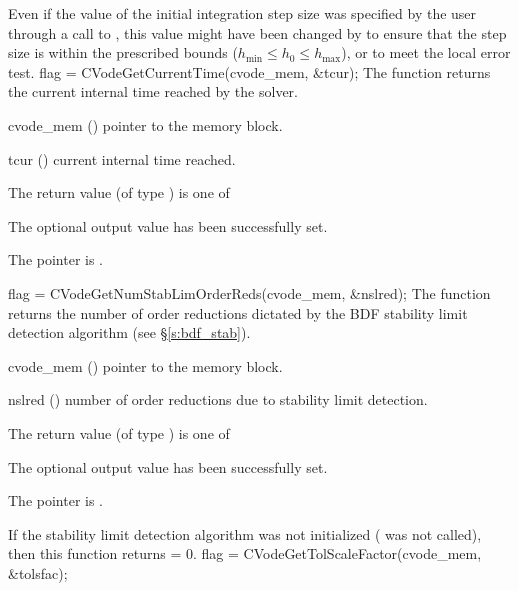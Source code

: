 {
  Even if the value of the initial integration step size was specified
  by the user through a call to , this value might have 
  been changed by {\cvode} to ensure that the step size is within the 
  prescribed bounds ($h_{\min} \le h_0 \le h_{\max}$), or to meet the
  local error test.
}
{
  flag = CVodeGetCurrentTime(cvode\_mem, \&tcur);
}
{
  The function  returns the
  current internal time reached by the solver.
}
{
  \begin{args}
  \item[cvode\_mem] ()
    pointer to the {\cvode} memory block.
  \item[tcur] ()
    current internal time reached.
  \end{args}
}
{
  The return value  (of type ) is one of
  \begin{args}
  \item[\Id{CV\_SUCCESS}] 
    The optional output value has been successfully set.
  \item[\Id{CV\_MEM\_NULL}]
    The  pointer is .
  \end{args}
}
{}
{
  flag = CVodeGetNumStabLimOrderReds(cvode\_mem, \&nslred);
}
{
  The function  returns the
  number of order reductions dictated by the BDF stability limit 
  detection algorithm (see \S\ref{s:bdf_stab}).
}
{
  \begin{args}
  \item[cvode\_mem] ()
    pointer to the {\cvode} memory block.
  \item[nslred] ()
    number of order reductions due to stability limit detection.
  \end{args}
}
{
  The return value  (of type ) is one of
  \begin{args}
  \item[\Id{CV\_SUCCESS}] 
    The optional output value has been successfully set.
  \item[\Id{CV\_MEM\_NULL}]
    The  pointer is .
  \end{args}
}
{
  If the stability limit detection algorithm was not initialized
  ( was not called), then this function
  returns  = 0.
}
{
  flag = CVodeGetTolScaleFactor(cvode\_mem, \&tolsfac);
}
